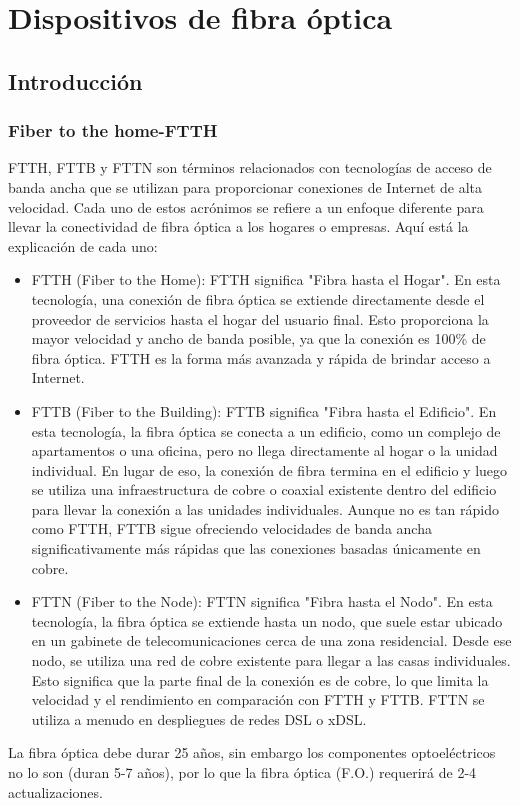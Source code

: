 \documentclass[
	12pt, %
	fleqn, %
	a4paper, %
	oneside, %
]{LegrandOrangeBook}
\begin{document}
\part{Dispositivos de fibra óptica}
\chapter{Introducción}
\section{Fiber to the home-FTTH}
FTTH, FTTB y FTTN son términos relacionados con tecnologías de acceso de banda ancha que se utilizan para proporcionar conexiones de Internet de alta velocidad. Cada uno de estos acrónimos se refiere a un enfoque diferente para llevar la conectividad de fibra óptica a los hogares o empresas. Aquí está la explicación de cada uno:
\begin{itemize}
\item FTTH (Fiber to the Home): FTTH significa "Fibra hasta el Hogar". En esta tecnología, una conexión de fibra óptica se extiende directamente desde el proveedor de servicios hasta el hogar del usuario final. Esto proporciona la mayor velocidad y ancho de banda posible, ya que la conexión es 100\% de fibra óptica. FTTH es la forma más avanzada y rápida de brindar acceso a Internet.

\item FTTB (Fiber to the Building): FTTB significa "Fibra hasta el Edificio". En esta tecnología, la fibra óptica se conecta a un edificio, como un complejo de apartamentos o una oficina, pero no llega directamente al hogar o la unidad individual. En lugar de eso, la conexión de fibra termina en el edificio y luego se utiliza una infraestructura de cobre o coaxial existente dentro del edificio para llevar la conexión a las unidades individuales. Aunque no es tan rápido como FTTH, FTTB sigue ofreciendo velocidades de banda ancha significativamente más rápidas que las conexiones basadas únicamente en cobre.

\item FTTN (Fiber to the Node): FTTN significa "Fibra hasta el Nodo". En esta tecnología, la fibra óptica se extiende hasta un nodo, que suele estar ubicado en un gabinete de telecomunicaciones cerca de una zona residencial. Desde ese nodo, se utiliza una red de cobre existente para llegar a las casas individuales. Esto significa que la parte final de la conexión es de cobre, lo que limita la velocidad y el rendimiento en comparación con FTTH y FTTB. FTTN se utiliza a menudo en despliegues de redes DSL o xDSL.
\end{itemize}
La fibra óptica debe durar 25 años, sin embargo los componentes optoeléctricos no lo son (duran 5-7 años), por lo que la fibra óptica (F.O.) requerirá de 2-4 actualizaciones.
\end{document}
